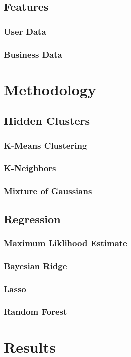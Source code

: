 \documentclass[11pt]{article}
\begin{document}
\subsection{Features}
\subsubsection{User Data}
\subsubsection{Business Data}

\section{Methodology}
\subsection{Hidden Clusters}
\subsubsection{K-Means Clustering}
\subsubsection{K-Neighbors}
\subsubsection{Mixture of Gaussians}

\subsection{Regression}
\subsubsection{Maximum Liklihood Estimate}
\subsubsection{Bayesian Ridge}
\subsubsection{Lasso}
\subsubsection{Random Forest}


\section{Results}
\end{document}
